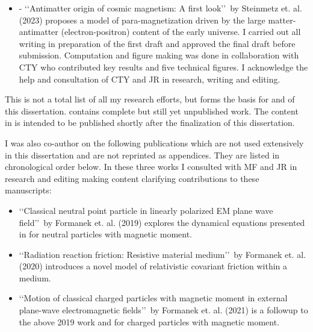 \begin{itemize}
    \item {} - \lq\lq Antimatter origin of cosmic magnetism: A first look\rq\rq\ by Steinmetz et. al. (2023) proposes a model of para-magnetization driven by the large matter-antimatter (electron-positron) content of the early universe. I carried out all writing in preparation of the first draft and approved the final draft before submission. Computation and figure making was done in collaboration with CTY who contributed key results and five technical figures. I acknowledge the help and consultation of CTY and JR in research, writing and editing.
\end{itemize}

This is not a total list of all my research efforts, but forms the basis for  and  of this dissertation.  contains complete but still yet unpublished work. The content in  is intended to be published shortly after the finalization of this dissertation.

I was also co-author on the following publications which are not used extensively in this dissertation and are not reprinted as appendices. They are listed in chronological order below. In these three works I consulted with MF and JR in research and editing making content clarifying contributions to these manuscripts:
\begin{itemize}
    \item \lq\lq Classical neutral point particle in linearly polarized EM plane wave field\rq\rq\ by Formanek et. al. (2019) explores the dynamical equations presented in  for neutral particles with magnetic moment.
    \item \lq\lq Radiation reaction friction: Resistive material medium\rq\rq\ by Formanek et. al. (2020) introduces a novel model of relativistic covariant friction within a medium.
    \item \lq\lq Motion of classical charged particles with magnetic moment in external plane-wave electromagnetic fields\rq\rq\ by Formanek et. al. (2021) is a followup to the above 2019 work and  for charged particles with magnetic moment.
\end{itemize}

